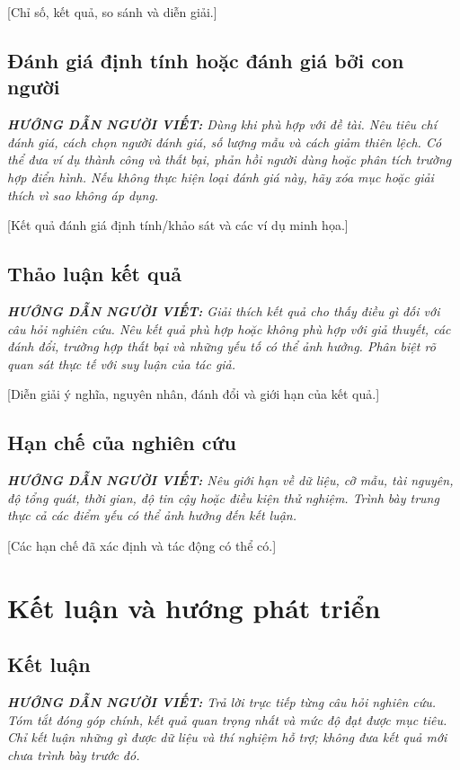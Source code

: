 \documentclass[12pt,a4paper]{report}
\newcommand{\huongdan}[1]{%
  \par\smallskip\noindent
  \textit{\textbf{HƯỚNG DẪN NGƯỜI VIẾT:} #1}%
  \par\smallskip}
\begin{document}
[Chỉ số, kết quả, so sánh và diễn giải.]

\section{Đánh giá định tính hoặc đánh giá bởi con người}

\huongdan{Dùng khi phù hợp với đề tài. Nêu tiêu chí đánh giá, cách chọn người
đánh giá, số lượng mẫu và cách giảm thiên lệch. Có thể đưa ví dụ thành công
và thất bại, phản hồi người dùng hoặc phân tích trường hợp điển hình. Nếu không
thực hiện loại đánh giá này, hãy xóa mục hoặc giải thích vì sao không áp dụng.}

[Kết quả đánh giá định tính/khảo sát và các ví dụ minh họa.]

\section{Thảo luận kết quả}

\huongdan{Giải thích kết quả cho thấy điều gì đối với câu hỏi nghiên cứu.
Nêu kết quả phù hợp hoặc không phù hợp với giả thuyết, các đánh đổi, trường hợp
thất bại và những yếu tố có thể ảnh hưởng. Phân biệt rõ quan sát thực tế với
suy luận của tác giả.}

[Diễn giải ý nghĩa, nguyên nhân, đánh đổi và giới hạn của kết quả.]

\section{Hạn chế của nghiên cứu}

\huongdan{Nêu giới hạn về dữ liệu, cỡ mẫu, tài nguyên, độ tổng quát, thời gian,
độ tin cậy hoặc điều kiện thử nghiệm. Trình bày trung thực cả các điểm yếu có
thể ảnh hưởng đến kết luận.}

[Các hạn chế đã xác định và tác động có thể có.]

\chapter{Kết luận và hướng phát triển}

\section{Kết luận}

\huongdan{Trả lời trực tiếp từng câu hỏi nghiên cứu. Tóm tắt đóng góp chính,
kết quả quan trọng nhất và mức độ đạt được mục tiêu. Chỉ kết luận những gì
được dữ liệu và thí nghiệm hỗ trợ; không đưa kết quả mới chưa trình bày trước đó.}
\end{document}
